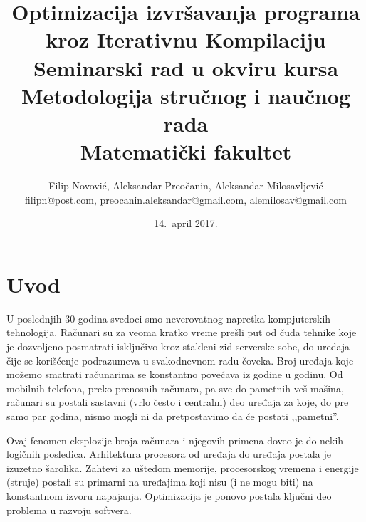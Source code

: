 \documentclass[a4paper]{article}
\begin{document}
\title{Optimizacija izvršavanja programa kroz Iterativnu Kompilaciju\\ \small{Seminarski rad u okviru kursa\\Metodologija stručnog i naučnog rada\\ Matematički fakultet}}

\author{Filip Novović, Aleksandar Preočanin, Aleksandar Milosavljević\\ filipn@post.com, preocanin.aleksandar@gmail.com, alemilosav@gmail.com }
\date{14.~april 2017.}
\maketitle

\tableofcontents

\newpage

\section{Uvod}
\label{sec:uvod}

U poslednjih 30 godina svedoci smo neverovatnog napretka kompjuterskih tehnologija. 
Računari su za veoma kratko vreme prešli put od čuda tehnike koje je dozvoljeno posmatrati isključivo kroz stakleni zid serverske sobe, 
do uređaja čije se korišćenje podrazumeva u svakodnevnom radu čoveka. Broj uređaja koje možemo smatrati računarima se konstantno povećava iz godine u godinu. 
Od mobilnih telefona, preko prenosnih računara, pa sve do pametnih veš-mašina, računari su postali sastavni (vrlo često i centralni) deo uređaja za koje, 
do pre samo par godina, nismo mogli ni da pretpostavimo da će postati ,,pametni''.
\par
Ovaj fenomen eksplozije broja računara i njegovih primena doveo je do nekih logičnih posledica. 
Arhitektura procesora od uređaja do uređaja postala je izuzetno šarolika. Zahtevi za uštedom memorije, procesorskog vremena i energije (struje) postali su primarni na uređajima koji nisu 
(i ne mogu biti) na konstantnom izvoru napajanja. Optimizacija je ponovo postala ključni deo problema u razvoju softvera. 
\end{document}
